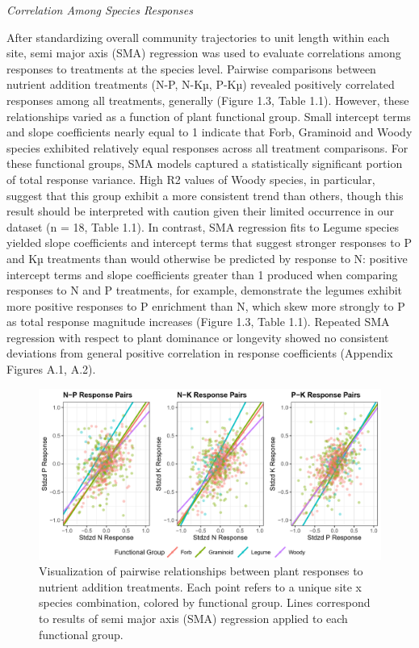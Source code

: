 \documentclass[twoside,12pt,final]{ucthesis-CA2012}
\begin{document}
\begin{ucmainmatter}
\emph{Correlation Among Species Responses}

After standardizing overall community trajectories to unit length within each site, semi major axis (SMA) regression was used to evaluate correlations among responses to treatments at the species level. Pairwise comparisons between nutrient addition treatments (N-P, N-Kµ, P-Kµ) revealed positively correlated responses among all treatments, generally (Figure 1.3, Table 1.1). However, these relationships varied as a function of plant functional group. Small intercept terms and slope coefficients nearly equal to 1 indicate that Forb, Graminoid and Woody species exhibited relatively equal responses across all treatment comparisons. For these functional groups, SMA models captured a statistically significant portion of total response variance. High R2 values of Woody species, in particular, suggest that this group exhibit a more consistent trend than others, though this result should be interpreted with caution given their limited occurrence in our dataset (n = 18, Table 1.1).
In contrast, SMA regression fits to Legume species yielded slope coefficients and intercept terms that suggest stronger responses to P and Kµ treatments than would otherwise be predicted by response to N: positive intercept terms and slope coefficients greater than 1 produced when comparing responses to N and P treatments, for example, demonstrate the legumes exhibit more positive responses to P enrichment than N, which skew more strongly to P as total response magnitude increases (Figure 1.3, Table 1.1).
Repeated SMA regression with respect to plant dominance or longevity showed no consistent deviations from general positive correlation in response coefficients (Appendix Figures A.1, A.2).
\begin{figure}
\centering
\includegraphics[width=\textwidth,height=0.35\textheight]{figure/Fig1_3.png}
\caption{Visualization of pairwise relationships between plant responses to nutrient addition treatments. Each point refers to a unique site x species combination, colored by functional group. Lines correspond to results of semi major axis (SMA) regression applied to each functional group. \label{fig-1-3}}

\end{figure}
\end{ucmainmatter}
\end{document}

